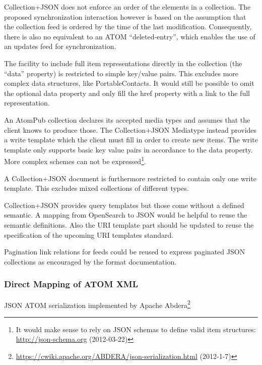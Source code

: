 \documentclass[12pt,a4paper,twoside]{scrartcl}		%
\newcommand{\citeurl}[2]{\url{#1} (#2)}
\begin{document}
Collection+JSON does not enforce an order of the elements in a collection. The
proposed synchronization interaction however is based on the assumption that the
collection feed is ordered by the time of the last modification. Consequently,
there is also no equivalent to an ATOM
``deleted-entry''\cite{draft-snell-atompub-tombstones-14}, which enables the use
of an updates feed for synchronization.

The facility to include full item representations directly in the collection
(the ``data'' property) is restricted to simple key/value pairs. This excludes
more complex data structures, like PortableContacts. It would still be possible
to omit the optional data property and only fill the href property with a link
to the full representation.

An AtomPub collection declares its accepted media types and assumes that the
client knows to produce those. The Collection+JSON Mediatype instead provides a
write template which the client must fill in order to create new items. The
write template only supports basic key value pairs in accordance to the data
property. More complex schemes can not be expressed\footnote{It would make sense
  to rely on JSON schemas to define valid item structures:
  \citeurl{http://json-schema.org}{2012-03-22}}.

A Collection+JSON document is furthermore restricted to contain only one write
template. This excludes mixed collections of different types.

Collection+JSON provides query templates but those come without a defined
semantic. A mapping from OpenSearch to JSON would be helpful to reuse the
semantic definitions. Also the URI template part should be updated to reuse the
specification of the upcoming URI templates standard\cite{Gregorio2012}.

Pagination link relations for feeds\cite{RFC5005} could be reused to express
paginated JSON collections as encouraged by the format
documentation\cite[sec. 5.5]{Amundsen2011a}.



\subsubsection{Direct Mapping of ATOM XML}
JSON ATOM serialization implemented by Apache
Abdera\footnote{\cite{Snell2008}
  \citeurl{https://cwiki.apache.org/ABDERA/json-serialization.html}{2012-1-7}}
\end{document}
